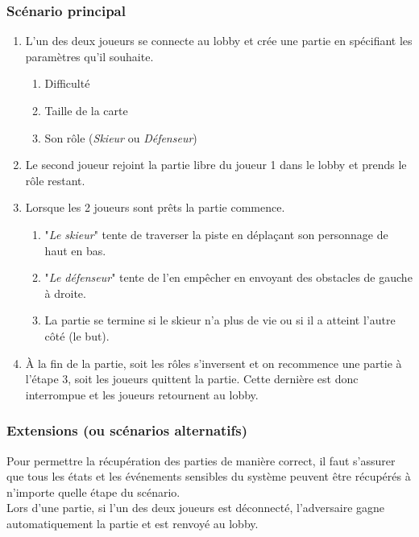 \documentclass[a4paper,11pt]{article}
\begin{document}
	\subsubsection{Scénario principal}
	\begin{enumerate}
		\item L'un des deux joueurs se connecte au lobby et crée une partie en spécifiant les paramètres qu'il souhaite.
		\begin{enumerate}
			\item Difficulté
			\item Taille de la carte
			\item Son rôle (\textit{Skieur} ou \textit{Défenseur})
		\end{enumerate}
		\item Le second joueur rejoint la partie libre du joueur 1 dans le lobby et prends le rôle restant.
		\item Lorsque les 2 joueurs sont prêts la partie commence.
		\begin{enumerate}
			\item "\textit{Le skieur}" tente de traverser la piste en déplaçant son personnage de haut en bas.
			\item "\textit{Le défenseur}" tente de l'en empêcher en envoyant des obstacles de gauche à droite.
			\item La partie se termine si le skieur n'a plus de vie ou si il a atteint l'autre côté (le but).
		\end{enumerate}
		\item À la fin de la partie, soit les rôles s'inversent et on recommence une partie à l'étape 3, soit les joueurs quittent la partie. Cette dernière est donc interrompue et les joueurs retournent au lobby.
	\end{enumerate}
		
	\subsubsection{Extensions (ou scénarios alternatifs)}
	Pour permettre la récupération des parties de manière correct, il faut s'assurer que tous les états et les événements sensibles du système peuvent être récupérés à n'importe quelle étape du scénario. \\
	
	Lors d'une partie, si l'un des deux joueurs est déconnecté, l'adversaire gagne automatiquement la partie et est renvoyé au lobby.
	
\end{document}
